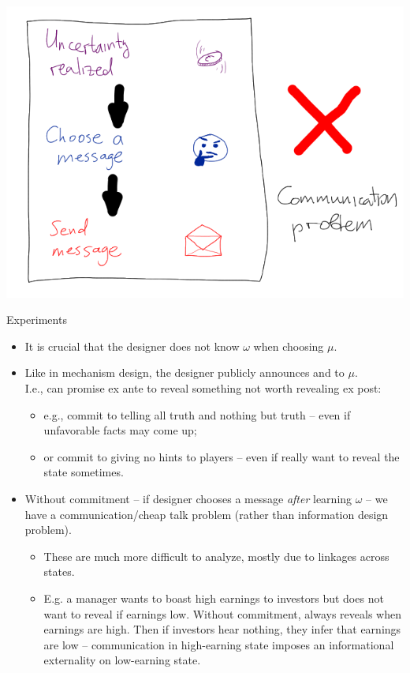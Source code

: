 \documentclass[english,10pt
,aspectratio=169
]{beamer}
\begin{document}
\begin{frame}
	\centering
	\includegraphics[scale=0.7]{pics/M7/timing2}
\end{frame}


\begin{frame}{Experiments}
\begin{itemize}
	\item It is crucial that the designer \alert{does not know $\omega$} when choosing $\mu$.
	\item Like in mechanism design, the designer publicly announces and  to $\mu$. 
	\\ I.e., can promise ex ante to reveal something not worth revealing ex post:
	\begin{itemize}
		\item e.g., commit to telling all truth and nothing but truth -- even if unfavorable facts may come up;
		\item or commit to giving no hints to players -- even if really want to reveal the state sometimes.
	\end{itemize}
	\item Without commitment -- if designer chooses a message \emph{after} learning $\omega$ -- we have a \alert{communication/cheap talk problem} (rather than information design problem).
	\begin{itemize}
		\item These are much more difficult to analyze, mostly due to linkages across states.
		\item E.g. a manager wants to boast high earnings to investors but does not want to reveal if earnings low. Without commitment, always reveals when earnings are high. Then if investors hear nothing, they infer that earnings are low -- communication in high-earning state imposes an informational externality on low-earning state.
	\end{itemize}
\end{itemize}
\end{frame}
\end{document}
